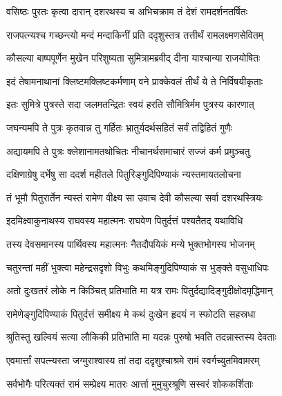 
\twolineshloka
{वसिष्ठः पुरतः कृत्वा दारान् दशरथस्य च}
{अभिचक्राम तं देशं रामदर्शनतर्षितः} %

\twolineshloka
{राजपत्न्यश्च गच्छन्त्यो मन्दं मन्दाकिनीं प्रति}
{ददृशुस्तत्र तत्तीर्थं रामलक्ष्मणसेवितम्} %

\twolineshloka
{कौसल्या बाष्पपूर्णेन मुखेन परिशुष्यता}
{सुमित्रामब्रवीद् दीना याश्चान्या राजयोषितः} %

\twolineshloka
{इदं तेषामनाथानां क्लिष्टमक्लिष्टकर्मणाम्}
{वने प्राक्केवलं तीर्थं ये ते निर्विषयीकृताः} %

\twolineshloka
{इतः सुमित्रे पुत्रस्ते सदा जलमतन्द्रितः}
{स्वयं हरति सौमित्रिर्मम पुत्रस्य कारणात्} %

\twolineshloka
{जघन्यमपि ते पुत्रः कृतवान्न तु गर्हितः}
{भ्रातुर्यदर्थसहितं सर्वं तद्विहितं गुणैः} %

\twolineshloka
{अद्यायमपि ते पुत्रः क्लेशानामतथोचितः}
{नीचानर्थसमाचारं सज्जं कर्म प्रमुञ्चतु} %

\twolineshloka
{दक्षिणाग्रेषु दर्भेषु सा ददर्श महीतले}
{पितुरिङ्गुदिपिण्याकं न्यस्तमायतलोचना} %

\twolineshloka
{तं भूमौ पितुरार्तेन न्यस्तं रामेण वीक्ष्य सा}
{उवाच देवी कौसल्या सर्वा दशरथस्त्रियः} %

\twolineshloka
{इदमिक्ष्वाकुनाथस्य राघवस्य महात्मनः}
{राघवेण पितुर्दत्तं पश्यतैतद् यथाविधि} %

\twolineshloka
{तस्य देवसमानस्य पार्थिवस्य महात्मनः}
{नैतदौपयिकं मन्ये भुक्तभोगस्य भोजनम्} %

\twolineshloka
{चतुरन्तां महीं भुक्त्वा महेन्द्रसदृशो विभुः}
{कथमिङ्गुदिपिण्याकं स भुङ्क्ते वसुधाधिपः} %

\twolineshloka
{अतो दुःखतरं लोके न किञ्चित् प्रतिभाति मा}
{यत्र रामः पितुर्दद्यादिङ्गुदीक्षोदमृद्धिमान्} %

\twolineshloka
{रामेणेङ्गुदिपिण्याकं पितुर्दत्तं समीक्ष्य मे}
{कथं दुःखेन हृदयं न स्फोटति सहस्रधा} %

\twolineshloka
{श्रुतिस्तु खल्वियं सत्या लौकिकी प्रतिभाति मा}
{यदन्नः पुरुषो भवति तदन्नास्तस्य देवताः} %

\twolineshloka
{एवमार्त्तां सपत्न्यस्ता जग्मुराश्वास्य तां तदा}
{ददृशुश्चाश्रमे रामं स्वर्गच्युतमिवामरम्} %

\twolineshloka
{सर्वभोगैः परित्यक्तं रामं सम्प्रेक्ष्य मातरः}
{आर्त्ता मुमुचुरश्रूणि सस्वरं शोककर्शिताः} %

